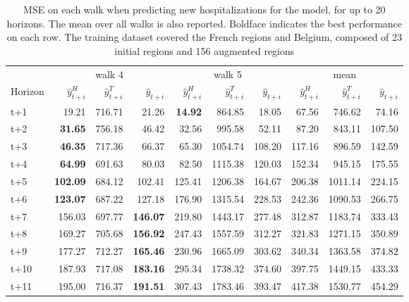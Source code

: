 \begin{table}[H]
\centering
\caption{MSE on each walk when predicting new hospitalizations for the model, for up to 20 horizons. The mean over all walks is also reported. Boldface indicates the best performance on each row. The training dataset covered the French regions and Belgium, composed of 23 initial regions and 156 augmented regions }
\label{tab:MSE_walk_assemble}
\begin{tabular}{lrrrrrrrrr}
\toprule
 & \multicolumn{3}{c}{walk 4} & \multicolumn{3}{c}{walk 5} & \multicolumn{3}{c}{mean} 
\\

\cmidrule(lr){2-4} \cmidrule(lr){5-7} \cmidrule(lr){8-10} 
Horizon & $\hat{y}_{t+i}^H$ & $\hat{y}_{t+i}^T$ & $\hat{y}_{t+i}$ & $\hat{y}_{t+i}^H$ & $\hat{y}_{t+i}^T$ & $\hat{y}_{t+i}$ & $\hat{y}_{t+i}^H$ & $\hat{y}_{t+i}^T$ & $\hat{y}_{t+i}$ \\
\midrule
t+1  & 19.21  & 716.71  & 21.26  & \textbf{14.92}  & 864.85  & 18.05  & 67.56  & 746.62  & 74.16  \\
t+2  & \textbf{31.65}  & 756.18  & 46.42  & 32.56  & 995.58  & 52.11  & 87.20  & 843.11  & 107.50  \\
t+3  & \textbf{46.35}  & 717.36  & 66.37  & 65.30  & 1054.74  & 108.20  & 117.16  & 896.59  & 142.59  \\
t+4  & \textbf{64.99}  & 691.63  & 80.03  & 82.50  & 1115.38  & 120.03  & 152.34  & 945.15  & 175.55  \\
t+5  & \textbf{102.09}  & 684.12  & 102.41  & 125.41  & 1206.38  & 164.67  & 206.38  & 1011.14  & 224.15  \\
t+6  & \textbf{123.07}  & 687.22  & 127.18  & 176.90  & 1315.54  & 228.53  & 242.36  & 1090.53  & 266.75  \\
t+7  & 156.03  & 697.77  & \textbf{146.07}  & 219.80  & 1443.17  & 277.48  & 312.87  & 1183.74  & 333.43  \\
t+8  & 169.27  & 705.68  & \textbf{156.92}  & 247.43  & 1557.59  & 312.27  & 321.83  & 1271.15  & 350.89  \\
t+9  & 177.27  & 712.27  & \textbf{165.46}  & 230.96  & 1665.09  & 303.62  & 340.34  & 1363.58  & 374.82  \\
t+10  & 187.93  & 717.08  & \textbf{183.16}  & 295.34  & 1738.32  & 374.60  & 397.75  & 1449.15  & 433.33  \\
t+11  & 195.00  & 716.37  & \textbf{191.51}  & 307.43  & 1783.46  & 393.47  & 417.38  & 1530.77  & 454.29  \\

\end{tabular}
\end{table}
